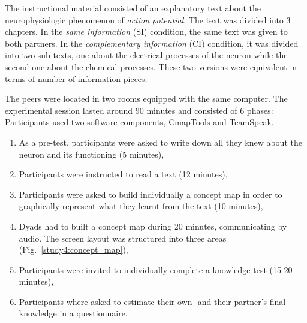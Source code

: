 \documentclass[natbib]{svjour3}
\begin{document}
The instructional material consisted of an explanatory text about the
neurophysiologic phenomenon of \emph{action potential}. The text was divided
into 3 chapters.  In the \emph{same information} (SI) condition, the same text
was given to both partners. In the \emph{complementary information} (CI)
condition, it was divided into two sub-texts, one about the electrical processes
of the neuron while the second one about the chemical processes. These two
versions were equivalent in terms of number of information pieces. 

The peers were located in two rooms equipped with the same
computer.  The experimental session lasted around 90 minutes and consisted of 6
phases: Participants used two software components, {\sc CmapTools} and {\sc
TeamSpeak}.

\begin{enumerate}

    \item As a pre-test, participants were asked to write down all they knew
        about the neuron and its functioning (5 minutes),

    \item Participants were instructed to read a text (12 minutes),

    \item Participants were asked to build individually a concept map in order to
        graphically represent what they learnt from the text (10 minutes),

    \item Dyads had to built a concept map during 20 minutes, communicating by
        audio.  The screen layout was structured into three areas
        (Fig.~\ref{study4:concept_map}),

    \item Participants were invited to individually complete a knowledge test
        (15-20 minutes),

    \item Participants where asked to estimate their own- and their partner's
        final knowledge in a questionnaire. 

\end{enumerate}
\end{document}

